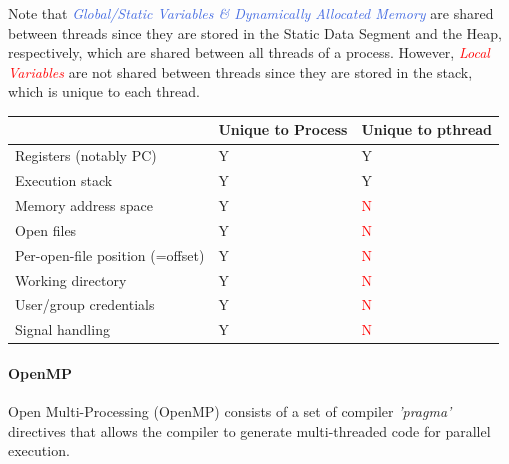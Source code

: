 \documentclass[openany,12pt]{book}
\newcommand{\red}[1]{\textcolor{Red}{#1}}
\newcommand{\blue}[1]{\textcolor{RoyalBlue}{#1}}
\begin{document}
Note that \blue{\textit{Global/Static Variables \& Dynamically Allocated Memory}} are shared between threads since they are stored in the Static Data Segment and the Heap, respectively, which are shared between all threads of a process. However, \red{\textit{Local Variables}} are not shared between threads since they are stored in the stack, which is unique to each thread.


\begin{samepage}
    \begin{center}
        \begin{tabular}{|>{\raggedright\arraybackslash}p{6cm}|
            >{\centering\arraybackslash}p{4cm}|
            >{\centering\arraybackslash}p{4cm}|}
            \hline
            \rowcolor{blue!30}
                                             & \textbf{Unique to Process} & \textbf{Unique to pthread} \\
            \hline
            Registers (notably PC)           & Y                          & Y                          \\
            Execution stack                  & Y                          & Y                          \\
            Memory address space             & Y                          & \red{N}                    \\
            Open files                       & Y                          & \red{N}                    \\
            Per-open-file position (=offset) & Y                          & \red{N}                    \\
            Working directory                & Y                          & \red{N}                    \\
            User/group credentials           & Y                          & \red{N}                    \\
            Signal handling                  & Y                          & \red{N}                    \\
            \hline
        \end{tabular}
    \end{center}
\end{samepage}


\newpage
\paragraph{OpenMP} Open Multi-Processing (OpenMP) consists of a set of compiler \textit{'pragma'} directives that allows the compiler to generate multi-threaded code for parallel execution.
\end{document}
